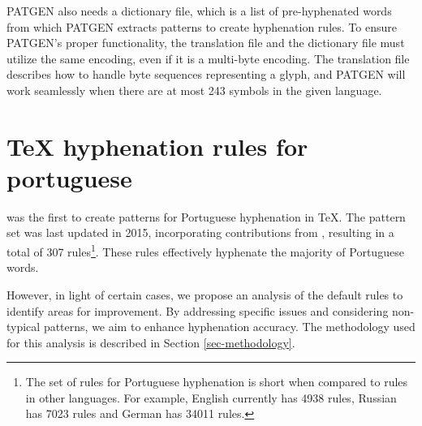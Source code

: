 \documentclass{article}
\begin{document}
PATGEN also needs a dictionary file, which is a list of pre-hyphenated words
from which PATGEN extracts patterns to create hyphenation rules. To ensure
PATGEN's proper functionality, the translation file and the dictionary file
must utilize the same encoding, even if it is a multi-byte encoding. The
translation file describes how to handle byte sequences representing a glyph,
and PATGEN will work seamlessly when there are at most 243 symbols in the given
language.





\section{\TeX{} hyphenation rules for portuguese}\label{sec-tex-hyphen-pt}
\textcite{rezende1987} was the first to create patterns for Portuguese hyphenation
in \TeX{}. The pattern set was last updated in 2015, incorporating
contributions from %
\textcite{hyphpt}, resulting in a total
of 307 rules\footnote{The set of rules for Portuguese hyphenation is short when
compared to rules in other languages. For example, English currently has 4938
rules, Russian has 7023 rules and German has 34011 rules.}. 
These rules effectively hyphenate the majority of Portuguese words.

However, in light of certain cases, we propose an analysis of the default rules
to identify areas for improvement. By addressing specific issues and
considering non-typical patterns, we aim to enhance hyphenation accuracy. The
methodology used for this analysis is described in Section
\ref{sec-methodology}.
\end{document}
